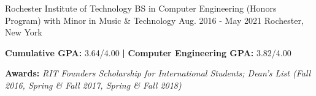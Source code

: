 

\begin{cventries}


\cventry
{Rochester Institute of Technology} %
{BS in Computer Engineering (Honors Program) with Minor in Music \& Technology} %
{Aug. 2016 - May 2021} %
{Rochester, New York} %
{ %
\vspace{0.5mm}
\begin{cvitems}
\item{\textbf{Cumulative GPA: } 3.64/4.00 \textbf{|} \textbf{Computer Engineering GPA: } 3.82/4.00}
\item{\textbf{Awards: } \textit{RIT Founders Scholarship for International Students; Dean's List (Fall 2016, Spring \& Fall 2017,  Spring \& Fall 2018)}}
\end{cvitems}}





\end{cventries}
